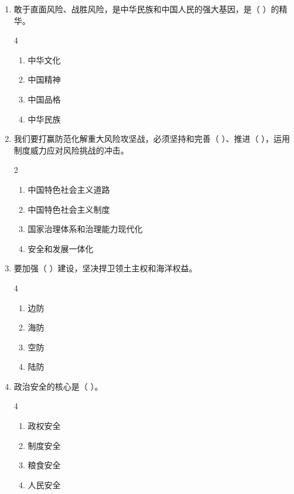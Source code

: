 \documentclass[a4paper,11pt]{ctexart}
\begin{document}
\begin{enumerate}
    \item 敢于直面风险、战胜风险，是中华民族和中国人民的强大基因，是（ ）的精华。
    \begin{multicols}{4}
    \begin{enumerate}
        \item 中华文化
        \item 中国精神
        \item 中国品格
        \item 中华民族
    \end{enumerate}
    \end{multicols}

    \item 我们要打赢防范化解重大风险攻坚战，必须坚持和完善（ ）、推进（ ），运用制度威力应对风险挑战的冲击。
    \begin{multicols}{2}
    \begin{enumerate}
        \item 中国特色社会主义道路
        \item 中国特色社会主义制度
        \item 国家治理体系和治理能力现代化
        \item 安全和发展一体化
    \end{enumerate}
    \end{multicols}

    \item 要加强（ ）建设，坚决捍卫领土主权和海洋权益。
    \begin{multicols}{4}
    \begin{enumerate}
        \item 边防
        \item 海防
        \item 空防
        \item 陆防
    \end{enumerate}
    \end{multicols}

    \item 政治安全的核心是（ ）。
    \begin{multicols}{4}
    \begin{enumerate}
        \item 政权安全
        \item 制度安全
        \item 粮食安全
        \item 人民安全
    \end{enumerate}
    \end{multicols}


\end{enumerate}
\end{document}

